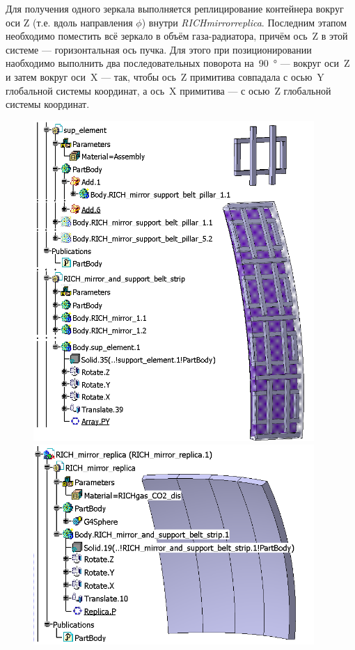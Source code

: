 Для получения одного зеркала выполняется реплицирование контейнера вокруг оси Z (т.е. вдоль направления $\phi$) внутри 
\textit{RICH\textunderscore mirror\textunderscore replica}. 
Последним этапом необходимо поместить всё зеркало в объём газа-радиатора, причём ось~Z в этой системе --- горизонтальная ось пучка. Для этого при позиционировании наобходимо выполнить два последовательных поворота на~\SI{90}{\degree} --- вокруг оси~Z и затем вокруг оси~X --- так, чтобы ось~Z примитива совпадала с осью~Y глобальной системы координат, а ось~X примитива --- с осью~Z глобальной системы координат. %

\begin{figure}[H]
\begin{minipage}[t]{0.495\textwidth}
\includegraphics[width=0.95\textwidth]{pictures/CbmRichMirror1.png}
\end{minipage}
\hspace{0.01\textwidth}
\begin{minipage}[t]{0.495\textwidth}
\includegraphics[width=0.95\textwidth]{pictures/CbmRichMirror2.png}

\end{minipage}
\end{figure}
